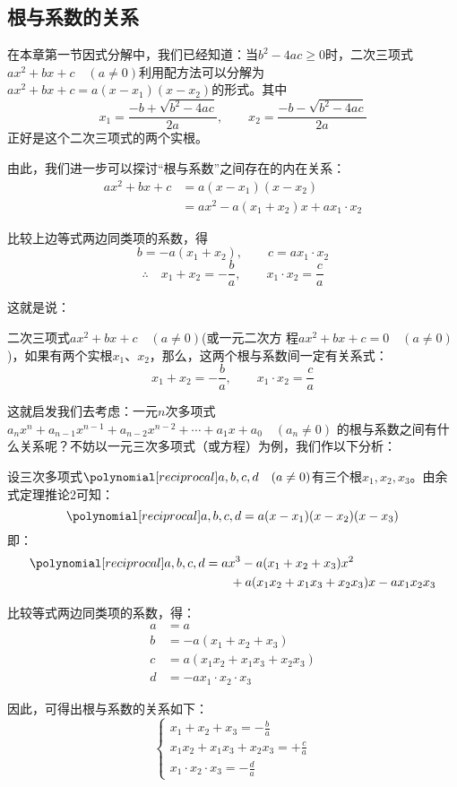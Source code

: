 \subsection{根与系数的关系}
在本章第一节因式分解中，我们已经知道：当$b^2-4ac\ge 0$时，二次三项式$ax^2+bx+c\quad (a\ne 0)$利用配方法可以分解为 $ax^2+bx+c=a(x-x_1)(x-x_2)$的形式。其中
\[x_1=\frac{-b+\sqrt{b^2-4ac}}{2a},\qquad x_2=\frac{-b-\sqrt{b^2-4ac}}{2a}\]
正好是这个二次三项式的两个实根。

由此，我们进一步可以探讨“根与系数”之间存在的内在关系：
\[\begin{split}
    ax^2+bx+c&=a (x-x_1) (x-x_2)\\
&=ax^2-a(x_1+x_2)x+ax_1\cdot x_2
\end{split}\]

比较上边等式两边同类项的系数，得
\[b=-a(x_1+x_2),\qquad c=ax_1\cdot x_2 \]
\[\therefore\quad x_1+x_2=-\frac{b}{a},\qquad x_1\cdot x_2=\frac{c}{a}\]

这就是说：
\begin{blk}{}
    二次三项式$ax^2+bx+c\quad (a\ne 0)$(或一元二次方
程$ax^2+bx+c=0\quad (a\ne 0)$ )，如果有两个实根$x_1$、$x_2$，那么，这两个根与系数间一定有关系式：
\[ x_1+x_2=-\frac{b}{a},\qquad x_1\cdot x_2=\frac{c}{a} \]
\end{blk}

这就启发我们去考虑：一元$n$次多项式
$a_nx^n+a_{n-1}x^{n-1}+a_{n-2}x^{n-2}+\cdots+a_1x+a_0\quad (a_n\ne 0)$
的根与系数之间有什么关系呢？不妨以一元三次多项式（或方程）为例，我们作以下分析：

设三次多项式$\poly{a,b,c,d}\quad (a\ne 0)$有三个根$x_1,x_2,x_3$。由余式定理推论2可知：
\[ \poly{a,b,c,d}=a(x-x_1)(x-x_2)(x-x_3) \]
即：
\[\begin{split}
    \poly{a,b,c,d} &= ax^3-a(x_1+x_2+x_3)x^2\\
    &\qquad +a(x_1x_2+x_1x_3+x_2x_3)x-ax_1x_2x_3
\end{split}\]

比较等式两边同类项的系数，得：
\[\begin{split}
    a&=a\\
    b&=-a(x_1+x_2+x_3)\\
    c&=a(x_1x_2+x_1x_3+x_2x_3)\\
    d&=-ax_1\cdot x_2\cdot x_3
\end{split}\]

因此，可得出根与系数的关系如下：
\[ \begin{cases}
    x_1+x_2+x_3 =-\frac{b}{a}\\
    x_1x_2+x_1x_3+x_2x_3=+\frac{c}{a}\\
    x_1\cdot x_2\cdot x_3=-\frac{d}{a}
\end{cases} \]

